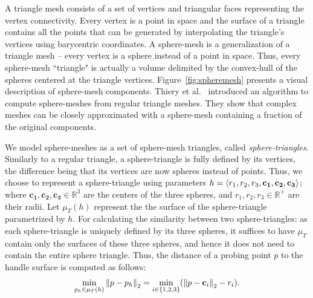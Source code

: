 A triangle mesh consists of a set of vertices and triangular faces representing
the vertex connectivity.
Every vertex is a point in space and the surface of a triangle contains all the points
that can be generated by interpolating the triangle's vertices using
barycentric coordinates.
A sphere-mesh is a generalization of a triangle mesh -- every vertex is
a sphere instead of a point in space.
Thus, every sphere-mesh ``triangle" is actually a volume delimited by the convex-hull
of the spheres centered at the triangle vertices.
Figure~\ref{fig:spheremesh} presents a visual description of sphere-mesh components.
Thiery et al.~\cite{spheremesh} introduced an algorithm to compute sphere-meshes from
regular triangle meshes.
They show that complex meshes can be closely approximated with a sphere-mesh containing
a fraction of the original components.

We model sphere-meshes as a set of sphere-mesh triangles, called \emph{sphere-triangles}.
Similarly to a regular triangle, a sphere-triangle is fully defined by 
its vertices, the difference being that its vertices are now spheres instead of
points.
Thus, we choose to represent a sphere-triangle using parameters
$h = \langle r_1, r_2, r_3, \bf c_1, c_2, c_3 \rangle$; where 
$\mathbf{c_1}, \mathbf{c_2}, \mathbf{c_3} \in \mathbb{R}^3$
are the centers of the three spheres, and $r_1, r_2, r_3 \in \mathbb{R}^+$ are
their radii.
Let $\mu_T(h)$ represent the the surface of the sphere-triangle parametrized by $h$.
For calculating the similarity between two sphere-triangles: as each sphere-triangle is uniquely defined by its three spheres, it suffices to have $\mu_T$ contain only the surfaces of these three spheres, and hence it does not need to contain the entire sphere triangle.
Thus, the distance of a probing point $p$ to the handle surface is computed as follows:
$$
\min_{p_h \in \mu_T(h)}\left\lVert p-p_h\right\rVert_2 = 
\min_{i\in\{1, 2, 3\}} (\left\lVert p - \mathbf{c}_i\right\rVert_2 - r_i).
$$

